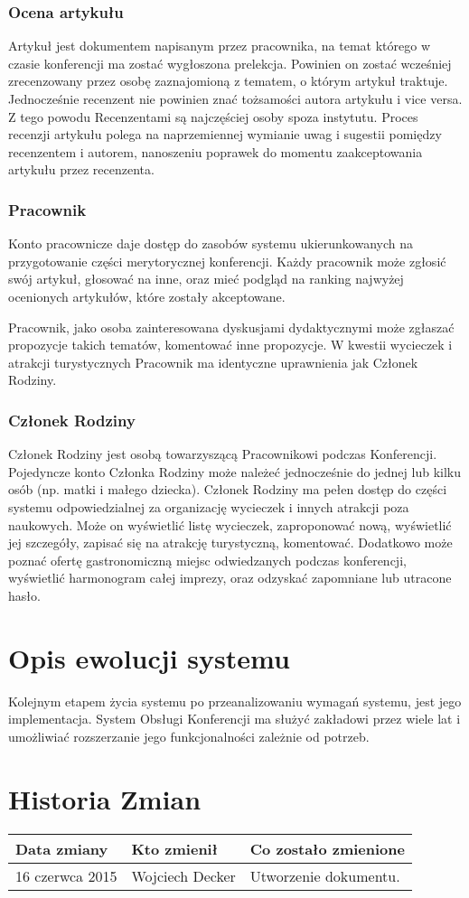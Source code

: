 \subsubsection{Ocena artykułu}
Artykuł jest dokumentem napisanym przez pracownika, na temat którego
w czasie konferencji ma zostać wygłoszona prelekcja. Powinien on zostać
wcześniej zrecenzowany przez osobę zaznajomioną z tematem, o którym
artykuł traktuje. Jednocześnie recenzent nie powinien znać tożsamości
autora artykułu i vice versa. Z tego powodu Recenzentami są najczęściej
osoby spoza instytutu. Proces recenzji artykułu polega na naprzemiennej
wymianie uwag i sugestii pomiędzy recenzentem i autorem, nanoszeniu
poprawek do momentu zaakceptowania artykułu przez recenzenta. 
\subsubsection{Pracownik}
Konto pracownicze daje dostęp do zasobów systemu ukierunkowanych na
przygotowanie części merytorycznej konferencji. Każdy pracownik może 
zgłosić swój artykuł, głosować na inne, oraz mieć podgląd na ranking 
najwyżej ocenionych artykułów, które zostały akceptowane. \par
Pracownik, jako osoba zainteresowana dyskusjami dydaktycznymi może 
zgłaszać propozycje takich tematów, komentować inne propozycje.
W kwestii wycieczek i atrakcji turystycznych Pracownik ma identyczne 
uprawnienia jak Członek Rodziny.
\subsubsection{Członek Rodziny}
Członek Rodziny jest osobą towarzyszącą Pracownikowi podczas Konferencji.
Pojedyncze konto Członka Rodziny może należeć jednocześnie do jednej lub
kilku osób (np. matki i małego dziecka). Członek Rodziny ma pełen dostęp
do części systemu odpowiedzialnej za organizację wycieczek i innych
atrakcji poza naukowych. Może on wyświetlić listę wycieczek, zaproponować
nową, wyświetlić jej szczegóły, zapisać się na atrakcję turystyczną,
komentować. Dodatkowo może poznać ofertę gastronomiczną miejsc odwiedzanych
podczas konferencji, wyświetlić harmonogram całej imprezy,
oraz odzyskać zapomniane lub utracone hasło.

\section{Opis ewolucji systemu}
Kolejnym etapem życia systemu po przeanalizowaniu wymagań systemu, jest
jego implementacja. System Obsługi Konferencji ma służyć zakładowi przez
wiele lat i umożliwiać rozszerzanie jego funkcjonalności zależnie od 
potrzeb.


\section{Historia Zmian}

\begin{tabularx}{\textwidth}{X|l|X}
\hline
\textbf{Data zmiany} & \textbf{Kto zmienił} & \textbf{Co zostało zmienione} \\ \hline
16 czerwca 2015          & Wojciech Decker & Utworzenie dokumentu.         \\ \hline
\end{tabularx}
